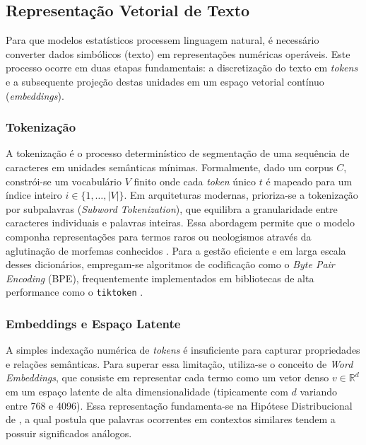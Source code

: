 \subsection{Representação Vetorial de Texto}
\label{sec:embeddings}

Para que modelos estatísticos processem linguagem natural, é necessário converter dados simbólicos (texto) em representações numéricas operáveis. Este processo ocorre em duas etapas fundamentais: a discretização do texto em \textit{tokens} e a subsequente projeção destas unidades em um espaço vetorial contínuo (\textit{embeddings}).

\subsubsection{Tokenização}

A tokenização é o processo determinístico de segmentação de uma sequência de caracteres em unidades semânticas mínimas. Formalmente, dado um corpus $C$, constrói-se um vocabulário $V$ finito onde cada \textit{token} único $t$ é mapeado para um índice inteiro $i \in \{1, \dots, |V|\}$. Em arquiteturas modernas, prioriza-se a tokenização por subpalavras (\textit{Subword Tokenization}), que equilibra a granularidade entre caracteres individuais e palavras inteiras. Essa abordagem permite que o modelo componha representações para termos raros ou neologismos através da aglutinação de morfemas conhecidos \citep{vaswani2017, jurafsky2024}. Para a gestão eficiente e em larga escala desses dicionários, empregam-se algoritmos de codificação como o \textit{Byte Pair Encoding} (BPE), frequentemente implementados em bibliotecas de alta performance como o \texttt{tiktoken} \citep{openai2023tiktoken}.

\subsubsection{Embeddings e Espaço Latente}

A simples indexação numérica de \textit{tokens} é insuficiente para capturar propriedades e relações semânticas. Para superar essa limitação, utiliza-se o conceito de \textit{Word Embeddings}, que consiste em representar cada termo como um vetor denso $v \in \mathbb{R}^d$ em um espaço latente de alta dimensionalidade (tipicamente com $d$ variando entre 768 e 4096). Essa representação \citep{bengio2003, openai2024embeddings} fundamenta-se na Hipótese Distribucional de \citet{harris1954}, a qual postula que palavras ocorrentes em contextos similares tendem a possuir significados análogos.

